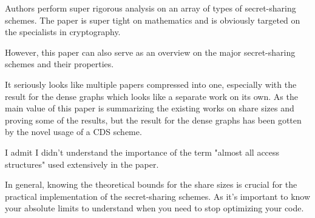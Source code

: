 Authors perform super rigorous analysis on an array of types of secret-sharing schemes.
The paper is super tight on mathematics and is obviously targeted on the specialists in cryptography.

However, this paper can also serve as an overview on the major secret-sharing schemes and their properties.

It seriously looks like multiple papers compressed into one, especially with the result for the dense graphs which looks like a separate work on its own.
As the main value of this paper is summarizing the existing works on share sizes and proving some of the results,
but the result for the dense graphs has been gotten by the novel usage of a CDS scheme.

I admit I didn't understand the importance of the term "almost all access structures" used extensively in the paper.

In general, knowing the theoretical bounds for the share sizes is crucial for the practical implementation of the secret-sharing schemes.
As it's important to know your absolute limits to understand when you need to stop optimizing your code.

